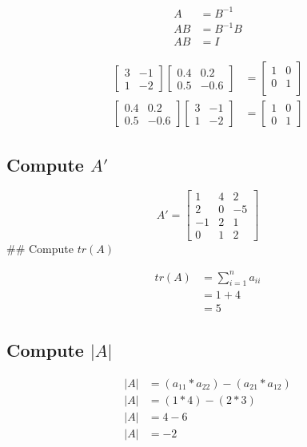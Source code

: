 \documentclass[
  letterpaper,
  DIV=11,
  numbers=noendperiod]{scrartcl}
\begin{document}
\[
\begin{aligned}
A &= B^{-1} \\
AB &= B^{-1}B \\
AB &= I
\end{aligned}
\]

\[
\begin{aligned}
\begin{bmatrix}
3 & -1 \\
1 & -2 \end{bmatrix}
\begin{bmatrix}
0.4 & 0.2 \\
0.5 & -0.6 \end{bmatrix} &= 
\begin{bmatrix}
1 & 0\\
0 & 1 \\ \end{bmatrix} \\
\begin{bmatrix}
0.4 & 0.2\\
0.5 & -0.6 \end{bmatrix} 
\begin{bmatrix}
3 & -1\\
1 & -2 \end{bmatrix} &= 
\begin{bmatrix}
1 & 0\\
0 & 1 \end{bmatrix}
\end{aligned}
\]

\subsection{\texorpdfstring{Compute
\(A'\)}{Compute A\textquotesingle{}}}\label{compute-a}

\[
A' =
\begin{bmatrix}
1&4&2\\
2&0&-5\\
-1&2&1\\
0&1&2 \end{bmatrix}
\] \#\# Compute \(tr(A)\)

\[
\begin{aligned}
tr(A)&=\sum_{i=1}^n a_{ii}\\
&=1+4\\
&=5
\end{aligned}
\]

\subsection{\texorpdfstring{Compute
\(|A|\)}{Compute \textbar A\textbar{}}}\label{compute-a-1}

\[
\begin{aligned}
|A| &= (a_{11} * a_{22}) - (a_{21} * a_{12})\\
|A| &= (1*4) - (2 * 3)\\
|A| &= 4-6\\
|A| &=-2
\end{aligned}
\]
\end{document}
